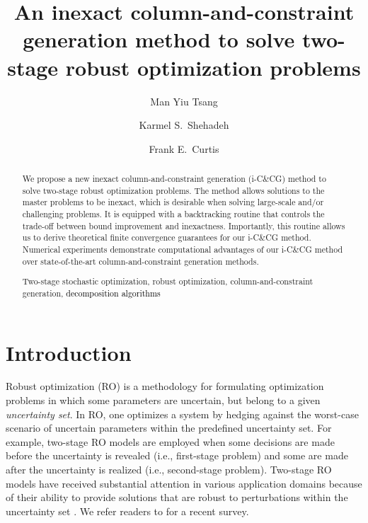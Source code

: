 \documentclass[preprint,review,11pt]{elsarticle}
\theoremstyle{definition}
\theoremstyle{remark}
\newcommand{\blue}{\textcolor{black}}
\begin{document}
\setlength{\abovedisplayskip}{4pt}%
\setlength{\belowdisplayskip}{4pt}%
\setlength{\abovedisplayshortskip}{4pt}%
\setlength{\belowdisplayshortskip}{4pt}%

\begin{frontmatter}

\title{An inexact column-and-constraint generation method to solve two-stage robust optimization problems}


\author[mymainaddress1]{Man Yiu Tsang}
\author[mymainaddress1]{Karmel S.~Shehadeh}
\author[mymainaddress1]{Frank E.~Curtis}


\address[mymainaddress1]{Department of Industrial and Systems Engineering, Lehigh University, Bethlehem, PA,  USA}

\begin{abstract}  %
\noindent We propose a new inexact column-and-constraint generation (i-C\&CG) method to solve two-stage robust optimization problems.  The method allows solutions to the master problems to be inexact, which is desirable when solving large-scale and/or challenging problems.  It is equipped with a backtracking routine that controls the trade-off between bound improvement and inexactness.  Importantly, this routine allows us to derive theoretical finite convergence guarantees for our i-C\&CG method.  Numerical experiments demonstrate computational advantages of our i-C\&CG method over state-of-the-art column-and-constraint generation methods.
\begin{keyword} 
Two-stage stochastic optimization, robust optimization, column-and-constraint generation,  \blue{decomposition algorithms}
\end{keyword}
\end{abstract}
\end{frontmatter}



\section{Introduction}

Robust optimization (RO) is a methodology for formulating optimization problems in which some parameters are uncertain, but belong to a given \textit{uncertainty set}. In RO, one optimizes a system by hedging against the worst-case scenario of uncertain parameters within the predefined uncertainty set. For example, two-stage RO models are employed when some decisions are made before the uncertainty is revealed (i.e., first-stage problem) and some are made after the uncertainty is realized (i.e., second-stage problem). Two-stage RO models have received substantial attention in various application domains because of their ability to provide solutions that are robust to perturbations within the uncertainty set \citep{An_et_al:2014, Neyshabouri_Berg:2017, Zhang_Liu:2022}. We refer readers to \cite{Gabrel_et_al:2014} for a recent survey.
\end{document}
